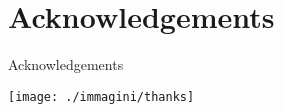 \section*{Acknowledgements}
\begin{frame}{Acknowledgements}
\begin{center}
\texttt{[image: ./immagini/thanks]}
\end{center}
\end{frame}